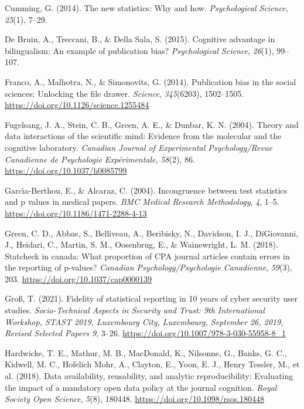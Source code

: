 \documentclass[
  doc,
  longtable,
  nolmodern,
  notxfonts,
  notimes,
  colorlinks=true,linkcolor=blue,citecolor=blue,urlcolor=blue]{apa7}
\newlength{\cslhangindent}
\newenvironment{CSLReferences}[2] %
 {\begin{list}{}{%
  \setlength{\itemindent}{0pt}
  \setlength{\leftmargin}{0pt}
  \setlength{\parsep}{0pt}
  \ifodd #1
   \setlength{\leftmargin}{\cslhangindent}
   \setlength{\itemindent}{-1\cslhangindent}
  \fi
  \setlength{\itemsep}{#2\baselineskip}}}
 {\end{list}}
\begin{document}
\begin{CSLReferences}{1}{0}
Cumming, G. (2014). The new statistics: Why and how. \emph{Psychological
Science}, \emph{25}(1), 7--29.

De Bruin, A., Treccani, B., \& Della Sala, S. (2015). Cognitive
advantage in bilingualism: An example of publication bias?
\emph{Psychological Science}, \emph{26}(1), 99--107.

Franco, A., Malhotra, N., \& Simonovits, G. (2014). Publication bias in
the social sciences: Unlocking the file drawer. \emph{Science},
\emph{345}(6203), 1502--1505.
\url{https://doi.org/10.1126/science.1255484}

Fugelsang, J. A., Stein, C. B., Green, A. E., \& Dunbar, K. N. (2004).
Theory and data interactions of the scientific mind: Evidence from the
molecular and the cognitive laboratory. \emph{Canadian Journal of
Experimental Psychology/Revue Canadienne de Psychologie
Exp{é}rimentale}, \emph{58}(2), 86.
\url{https://doi.org/10.1037/h0085799}

Garcı́a-Berthou, E., \& Alcaraz, C. (2004). Incongruence between test
statistics and p values in medical papers. \emph{BMC Medical Research
Methodology}, \emph{4}, 1--5.
\url{https://doi.org/10.1186/1471-2288-4-13}

Green, C. D., Abbas, S., Belliveau, A., Beribisky, N., Davidson, I. J.,
DiGiovanni, J., Heidari, C., Martin, S. M., Oosenbrug, E., \&
Wainewright, L. M. (2018). Statcheck in canada: What proportion of CPA
journal articles contain errors in the reporting of p-values?
\emph{Canadian Psychology/Psychologie Canadienne}, \emph{59}(3), 203.
\url{https://doi.org/10.1037/cap0000139}

Groß, T. (2021). Fidelity of statistical reporting in 10 years of cyber
security user studies. \emph{Socio-Technical Aspects in Security and
Trust: 9th International Workshop, STAST 2019, Luxembourg City,
Luxembourg, September 26, 2019, Revised Selected Papers 9}, 3--26.
\url{https://doi.org/10.1007/978-3-030-55958-8_1}

Hardwicke, T. E., Mathur, M. B., MacDonald, K., Nilsonne, G., Banks, G.
C., Kidwell, M. C., Hofelich Mohr, A., Clayton, E., Yoon, E. J., Henry
Tessler, M., et al. (2018). Data availability, reusability, and analytic
reproducibility: Evaluating the impact of a mandatory open data policy
at the journal cognition. \emph{Royal Society Open Science},
\emph{5}(8), 180448. \url{https://doi.org/10.1098/rsos.180448}


\end{CSLReferences}
\end{document}
